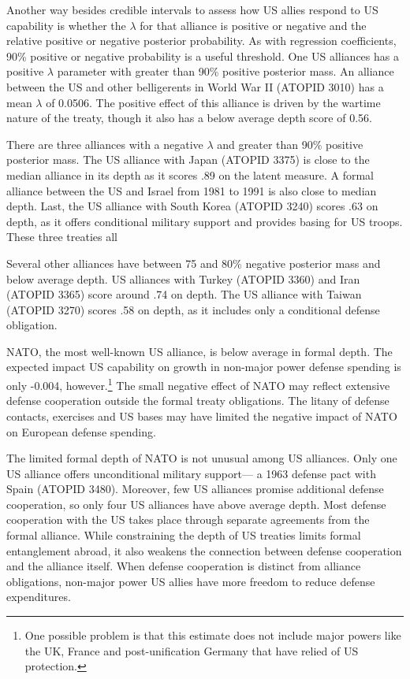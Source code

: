\documentclass[12pt]{article}
\begin{document}
Another way besides credible intervals to assess how US allies respond to US capability is whether the $\lambda$ for that  alliance is positive or negative and the relative positive or negative posterior probability. 
As with regression coefficients, 90\% positive or negative probability is a useful threshold. 
One US alliances has a positive $\lambda$ parameter with greater than 90\% positive posterior mass. 
An alliance between the US and other belligerents in World War II (ATOPID 3010) has a mean $\lambda$ of 0.0506. 
The positive effect of this alliance is driven by the wartime nature of the treaty, though it also has a below average depth score of 0.56.  


There are three alliances with a negative $\lambda$ and greater than 90\% positive posterior mass. 
The US alliance with Japan (ATOPID 3375) is close to the median alliance in its depth as it scores .89 on the latent measure. 
A formal alliance between the US and Israel from 1981 to 1991 is also close to median depth. 
Last, the US alliance with South Korea (ATOPID 3240) scores .63 on depth, as it offers conditional military support and provides basing for US troops. 
These three treaties all 


Several other alliances have between 75 and 80\% negative posterior mass and below average depth. 
US alliances with Turkey (ATOPID 3360) and Iran (ATOPID 3365)  score around .74 on depth. 
The US alliance with Taiwan (ATOPID 3270) scores .58 on depth, as it includes only a conditional defense obligation.  


NATO, the most well-known US alliance, is below average in formal depth. 
The expected impact US capability on growth in non-major power defense spending is only -0.004, however.\footnote{One possible problem is that this estimate does not include major powers like the UK, France and post-unification Germany that have relied of US protection.}
The small negative effect of NATO may reflect extensive defense cooperation outside the formal treaty obligations. 
The litany of defense contacts, exercises and US bases may have limited the negative impact of NATO on European defense spending. 


The limited formal depth of NATO is not unusual among US alliances. 
Only one US alliance offers unconditional military support--- a 1963 defense pact with Spain (ATOPID 3480). 
Moreover, few US alliances promise additional defense cooperation, so only four US alliances have above average depth. 
Most defense cooperation with the US takes place through separate agreements from the formal alliance. 
While constraining the depth of US treaties limits formal entanglement abroad, it also weakens the connection between defense cooperation and the alliance itself. 
When defense cooperation is distinct from alliance obligations, non-major power US allies have more freedom to reduce defense expenditures. 
\end{document}
